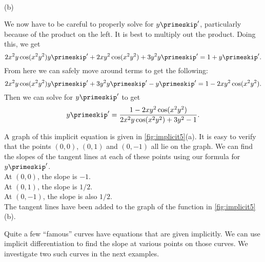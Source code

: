 \begin{example}
{
\\ (b)}

We now have to be careful to properly solve for $y\primeskip'$, particularly because of the product on the left.  It is best to multiply out the product.  Doing this, we get
\[2x^2y\cos(x^2y^2)y\primeskip' + 2xy^2\cos(x^2y^2) + 3y^2y\primeskip' = 1 + y\primeskip'.\]
From here we can safely move around terms to get the following:
\[2x^2y\cos(x^2y^2)y\primeskip' + 3y^2y\primeskip' - y\primeskip' = 1 - 2xy^2\cos(x^2y^2).\]
Then we can solve for $y\primeskip'$ to get
\[y\primeskip' = \frac{1 - 2xy^2\cos(x^2y^2)}{2x^2y\cos(x^2y^2)+3y^2-1}.\]

A graph of this implicit equation is given in \autoref{fig:implicit5}(a). It is easy to verify that the points $(0,0)$, $(0,1)$ and $(0,-1)$ all lie on the graph. We can find the slopes of the tangent lines at each of these points using our formula for $y\primeskip'$.\\
At $(0,0)$, the slope is $-1$.\\
At $(0,1)$, the slope is $1/2$.\\
At $(0,-1)$, the slope is also $1/2$.\\
The tangent lines have been added to the graph of the function in \autoref{fig:implicit5}(b).
\end{example}

Quite a few ``famous'' curves have equations that are given implicitly.  We can use implicit differentiation to find the slope at various points on those curves. We investigate two such curves in the next examples.\bigskip

